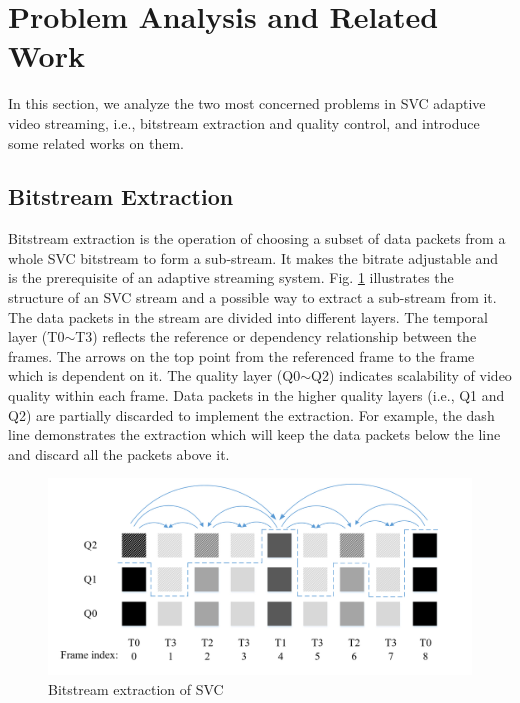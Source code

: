 \documentclass[journal]{IEEEtran}
\begin{document}
\section{Problem Analysis and Related Work}
\label{sec:analysis}

In this section, we analyze the two most concerned problems in SVC adaptive video streaming, i.e., bitstream extraction and quality control, and introduce some related works on them.

\subsection{Bitstream Extraction}

Bitstream extraction is the operation of choosing a subset of data packets from a whole SVC bitstream to form a sub-stream. It makes the bitrate adjustable and is the prerequisite of an adaptive streaming system. Fig. \ref{fig:Bitstream-Extraction} illustrates the structure of an SVC stream and a possible way to extract a sub-stream from it. The data packets in the stream are divided into different layers. The temporal layer (T0$\sim$T3) reflects the reference or dependency relationship between the frames. The arrows on the top point from the referenced frame to the frame which is dependent on it. The quality layer (Q0$\sim$Q2) indicates scalability of video quality within each frame. Data packets in the higher quality layers (i.e., Q1 and Q2) are partially discarded to implement the extraction. For example, the dash line demonstrates the extraction which will keep the data packets below the line and discard all the packets above it. 

\begin{figure}[h]
\centering
\includegraphics[width = 1.0\linewidth]{Bitstream-Extraction.jpg}
\caption{Bitstream extraction of SVC \label{fig:Bitstream-Extraction}}
\end{figure}
\end{document}
